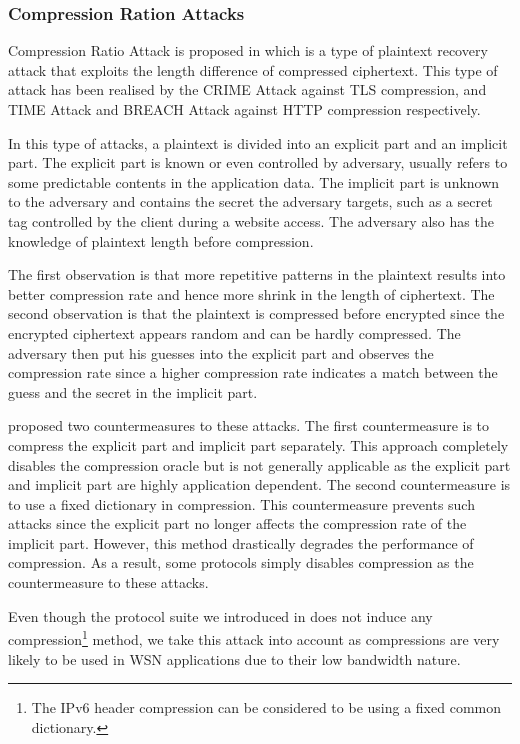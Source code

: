 \subsubsection{Compression Ration Attacks}

Compression Ratio Attack is proposed in \cite{CompressionRationAttack} which is a type of plaintext recovery attack that exploits the length difference of compressed ciphertext. This type of attack has been realised by the CRIME\cite{CRIME} Attack against TLS compression, and TIME\cite{TIME} Attack and BREACH\cite{BREACH} Attack against HTTP compression respectively. 

In this type of attacks, a plaintext is divided into an explicit part and an implicit part. The explicit part is known or even controlled by adversary, usually refers to some predictable contents in the application data. The implicit part is unknown to the adversary and contains the secret the adversary targets, such as a secret tag controlled by the client during a website access. The adversary also has the knowledge of plaintext length before compression.

The first observation is that more repetitive patterns in the plaintext results into better compression rate and hence more shrink in the length of ciphertext. The second observation is that the plaintext is compressed before encrypted since the encrypted ciphertext appears random and can be hardly compressed. The adversary then put his guesses into the explicit part and observes the compression rate since a higher compression rate indicates a match between the guess and the secret in the implicit part.

\cite{CompressionCountermeasure} proposed two countermeasures to these attacks. The first countermeasure is to compress the explicit part and implicit part separately. This approach completely disables the compression oracle but is not generally applicable as the explicit part and implicit part are highly application dependent. The second countermeasure is to use a fixed dictionary in compression. This countermeasure prevents such attacks since the explicit part no longer affects the compression rate of the implicit part. However, this method drastically degrades the performance of compression. As a result, some protocols simply disables compression as the countermeasure to these attacks.

Even though the protocol suite we introduced in  does not induce any compression\footnote{The IPv6 header compression can be considered to be using a fixed common dictionary.} method, we take this attack into account as compressions are very likely to be used in WSN applications due to their low bandwidth nature. 

